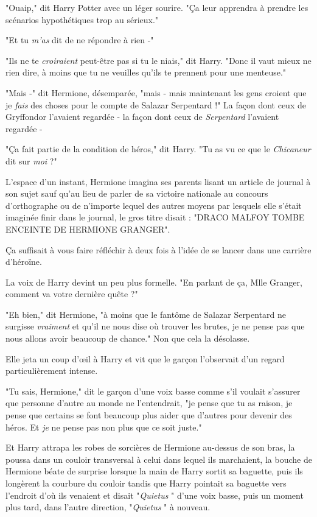 "Ouaip," dit Harry Potter avec un léger sourire. "Ça leur apprendra à prendre les scénarios hypothétiques trop au sérieux."

"Et tu \emph{m'as}  dit de ne répondre à rien -"

"Ils ne te \emph{croiraient}  peut-être pas si tu le niais," dit Harry. "Donc il vaut mieux ne rien dire, à moins que tu ne veuilles qu'ils te prennent pour une menteuse."

"Mais -" dit Hermione, désemparée, "mais - mais maintenant les gens croient que je \emph{fais}  des choses pour le compte de Salazar Serpentard !" La façon dont ceux de Gryffondor l'avaient regardée - la façon dont ceux de \emph{Serpentard}  l'avaient regardée -

"Ça fait partie de la condition de héros," dit Harry. "Tu as vu ce que le \emph{Chicaneur}  dit sur \emph{moi}  ?"

L'espace d'un instant, Hermione imagina ses parents lisant un article de journal à son sujet sauf qu'au lieu de parler de sa victoire nationale au concours d'orthographe ou de n'importe lequel des autres moyens par lesquels elle s'était imaginée finir dans le journal, le gros titre disait : "DRACO MALFOY TOMBE ENCEINTE DE HERMIONE GRANGER".

Ça suffisait à vous faire réfléchir à deux fois à l'idée de se lancer dans une carrière d'héroïne.

La voix de Harry devint un peu plus formelle. "En parlant de ça, Mlle Granger, comment va votre dernière quête ?"

"Eh bien," dit Hermione, "à moins que le fantôme de Salazar Serpentard ne surgisse \emph{vraiment}  et qu'il ne nous dise où trouver les brutes, je ne pense pas que nous allons avoir beaucoup de chance." Non que cela la désolasse.

Elle jeta un coup d'œil à Harry et vit que le garçon l'observait d'un regard particulièrement intense.

"Tu sais, Hermione," dit le garçon d'une voix basse comme s'il voulait s'assurer que personne d'autre au monde ne l'entendrait, "je pense que tu as raison, je pense que certains se font beaucoup plus aider que d'autres pour devenir des héros. Et \emph{je}  ne pense pas non plus que ce soit juste."

Et Harry attrapa les robes de sorcières de Hermione au-dessus de son bras, la poussa dans un couloir transversal à celui dans lequel ils marchaient, la bouche de Hermione béate de surprise lorsque la main de Harry sortit sa baguette, puis ils longèrent la courbure du couloir tandis que Harry pointait sa baguette vers l'endroit d'où ils venaient et disait "\emph{Quietus} " d'une voix basse, puis un moment plus tard, dans l'autre direction, "\emph{Quietus} " à nouveau.

